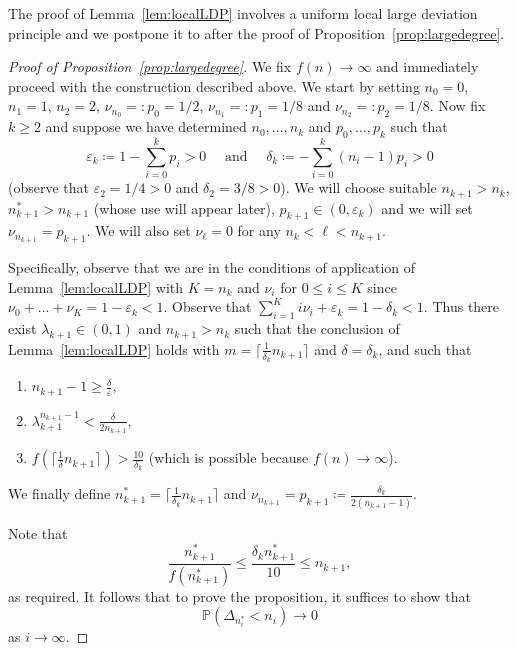 \documentclass[AHL,Unicode,longabstracts,published]{cedram}
\renewcommand{\P}{\mathbb{P}}
\newcommand*{\romanenumi}{\renewcommand*{\theenumi}{\roman{enumi}}}
\begin{document}
The proof of Lemma~\ref{lem:localLDP} involves a uniform local large deviation principle and we postpone it to after the proof of Proposition~\ref{prop:largedegree}.

\begin{proof}[Proof of Proposition~\ref{prop:largedegree}]
We fix $f(n)\to \infty$ and immediately proceed with the construction described above. We start by setting $n_{0}=0$, $n_1=1$, $n_2=2$, ${\nu}_{n_0}=:p_{0}=1/2$, ${\nu}_{n_1}=:p_1=1/8$ and ${\nu}_{n_2}=:p_2=1/8$. Now fix $k\geq 2$ and suppose we have determined $n_0,\dots,n_k$ and $p_0,\dots, p_k$ such that
\[
\varepsilon_k\coloneqq1-\sum_{i=0}^{k}p_i >0\quad \text{ and } \quad
\delta_k\coloneqq-\sum_{i=0}^{k}(n_i-1)p_i>0
\]
(observe that $\varepsilon_2=1/4>0$ and ${\delta_2}=3/8>0$). We will choose suitable $n_{k+1}>n_k$, $n_{k+1}^*>n_{k+1}$ (whose use will appear later), $p_{k+1} \in (0,\varepsilon_{k})$ and we will set ${\nu}_{n_{k+1}}=p_{k+1}$. We will also set ${\nu}_\ell=0$ for any $n_k<\ell<n_{k+1}$.


Specifically, observe that we are in the conditions of application of Lemma~\ref{lem:localLDP} with $K=n_k$ and $\nu_i$ for $0 \leq i\leq K$ since $\nu_0+\dots+\nu_K=1-\varepsilon_{k}<1$. Observe that $\sum_{i=1}^K i\nu_i+\varepsilon_{k}=1-\delta_{k}<1$. Thus there exist $\lambda_{k+1} \in (0,1)$ and $n_{k+1}>n_{k}$ such that the conclusion of Lemma~\ref{lem:localLDP} holds with $m=\lceil \tfrac{1}{\delta_{k}} n_{k+1} \rceil$ and $\delta=\delta_{k}$, and such that
\begin{enumerate}\romanenumi
\item\label{(1)} $n_{k+1}-1\geq \frac{\delta}{\varepsilon}$,
\item\label{(2)} $ \lambda_{k+1}^{n_{k+1}-1} <\frac{\delta}{2n_{k+1}}$, 
\item\label{(3)} $f(\lceil \tfrac{1}{\delta} n_{k+1}\rceil)>\frac{10}{\delta_{k}}$ (which is possible because $f(n)\to \infty$).
\end{enumerate}
We finally define $n_{k+1}^*=\lceil\tfrac{1}{\delta_{k}}n_{k+1}\rceil$ and $ \nu_{n_{k+1}}=p_{k+1} \coloneqq \frac{\delta_{k}}{2 (n_{k+1}-1)}$.

Note that
\[
\frac{n_{k+1}^*}{f\left(n_{k+1}^*\right)} \le \frac{\delta_k n_{k+1}^*}{10} \le n_{k+1},
\]
as required. It follows that to prove the proposition, it suffices to show that
\begin{equation}\label{eq:delta0}
\P\left(\Delta_{n^*_i}< n_i\right)\to 0
\end{equation}
as $i \to \infty$.


\end{proof}
\end{document}
